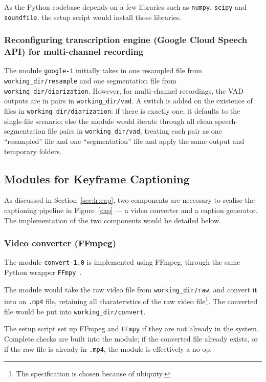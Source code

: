 As the Python codebase depends on a few libraries such as \texttt{numpy},
\texttt{scipy} and \texttt{soundfile}, the setup script would install
those libraries.

\subsubsection{Reconfiguring transcription engine (Google Cloud Speech API)
for multi-channel recording}

The module \texttt{google-1} initially takes in one resampled file from
\texttt{working\_dir/resample} and one segmentation file from
\texttt{working\_dir/diarization}. However, for multi-channel recordings,
the VAD outputs are in pairs in \texttt{working\_dir/vad}. A switch is
added on the existence of files in \texttt{working\_dir/diarization}:
if there is exactly one, it defaults to the single-file scenario;
else the module would iterate through all clean speech-segmentation file
pairs in \texttt{working\_dir/vad}, treating each pair as one ``resampled''
file and one ``segmentation'' file and apply the same output and temporary
folders.

\subsection{Modules for Keyframe Captioning}\label{sec:im:code:cap}

As discussed in Section~\ref{sec:lr:cap}, two components are necessary
to realise the captioning pipeline in Figure~\ref{cap} --- a video
converter and a caption generator. The implementation of the two
components would be detailed below.

\subsubsection{Video converter (FFmpeg)}

The module \texttt{convert-1.0} is implemented using FFmpeg, through the
same Python wrapper \texttt{FFmpy}~\cite{ffmpy}.

The module would take the raw video file from \texttt{working\_dir/raw},
and convert it into an \texttt{.mp4} file, retaining all charateristics
of the raw video file\footnote{The specification is chosen because of
ubiquity.}. The converted file would be put into \texttt{working\_dir/convert}.

The setup script set up FFmpeg and \texttt{FFmpy} if they are not already in
the system. Complete checks are built into the module; if the converted file
already exists, or if the raw file is already in \texttt{.mp4}, the
module is effectively a no-op.

